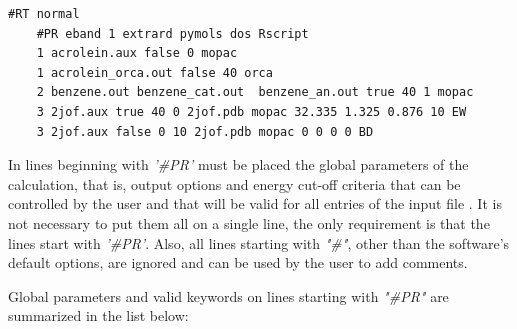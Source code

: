 \documentclass[a4paper,11pt]{refart}
\begin{document}
\hspace*{-\leftmarginwidth}
\begin{minipage}{\fullwidth}
	\begin{lstlisting}[caption=Exemplo de input utilizado a partir da versão 1.2.,label={ls.pri2}]
	#RT normal 
	#PR eband 1 extrard pymols dos Rscript
	1 acrolein.aux false 0 mopac 
	1 acrolein_orca.out false 40 orca 
	2 benzene.out benzene_cat.out  benzene_an.out true 40 1 mopac
	3 2jof.aux true 40 0 2jof.pdb mopac 32.335 1.325 0.876 10 EW 
	3 2jof.aux false 0 10 2jof.pdb mopac 0 0 0 0 BD
	\end{lstlisting}
\end{minipage}

In lines beginning with \emph{'\#PR'} must be placed the global parameters of the calculation, that is, output options and energy cut-off criteria that can be controlled by the user and that will be valid for all entries of the input file . It is not necessary to put them all on a single line, the only requirement is that the lines start with \emph{'\#PR'}. Also, all lines starting with \emph{"\#"}, other than the software's default options, are ignored and can be used by the user to add comments.

Global parameters and valid keywords on lines starting with \emph{"\#PR"} are summarized in the list below:
\end{document}
